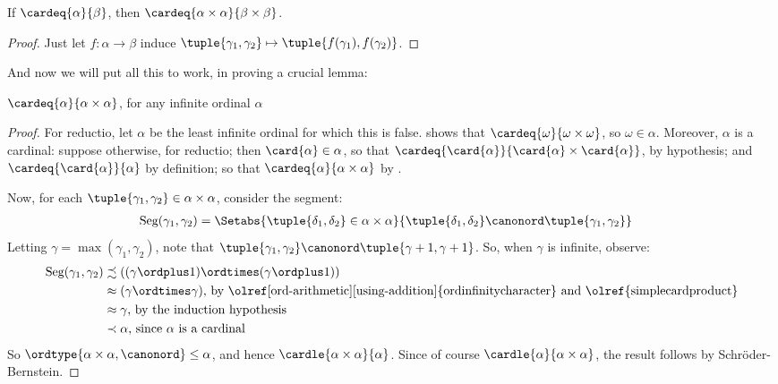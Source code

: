 \documentclass[../../../include/open-logic-section]{subfiles}
\begin{document}
\begin{prop}
If $\cardeq{\alpha}{\beta}$, then $\cardeq{\alpha \times \alpha}{\beta
\times \beta}$. 
\end{prop}

\begin{proof}
Just let $f \colon \alpha \to \beta$ induce $\tuple{\gamma_1,
\gamma_2} \mapsto \tuple{f(\gamma_1), f(\gamma_2)}$.
\end{proof}
\noindent
And now we will put all this to work, in proving a crucial lemma:
\begin{lem}
$\cardeq{\alpha}{\alpha \times \alpha}$, for any infinite ordinal
$\alpha$
\end{lem}

\begin{proof}
For reductio, let $\alpha$ be the least infinite ordinal for which
this is false.  shows
that $\cardeq{\omega}{\omega\times\omega}$, so $\omega \in \alpha$.
Moreover, $\alpha$ is a cardinal: suppose otherwise, for reductio;
then $\card{\alpha} \in \alpha$, so that
$\cardeq{\card{\alpha}}{\card{\alpha} \times \card{\alpha}}$, by
hypothesis; and $\cardeq{\card{\alpha}}{\alpha}$ by definition; so
that $\cardeq{\alpha}{\alpha\times\alpha}$ by
. 

Now, for each $\tuple{\gamma_1, \gamma_2} \in \alpha \times \alpha$,
consider the segment:
\begin{align*}
	\text{Seg}(\gamma_1, \gamma_2) &= \Setabs{\tuple{\delta_1, \delta_2} \in \alpha \times \alpha}{\tuple{\delta_1, \delta_2} \canonord \tuple{\gamma_1, \gamma_2}}
\end{align*}
Letting $\gamma = \max(\gamma_1, \gamma_2)$, note that $\tuple{\gamma_1, \gamma_2} \canonord \tuple{\gamma+1, \gamma + 1}$. So, when $\gamma$ is infinite, observe:
\begin{align*}
	\text{Seg}(\gamma_1, \gamma_2) & 
	\precsim ((\gamma \ordplus 1)\ordtimes (\gamma \ordplus 1))\\
	&\approx (\gamma \ordtimes \gamma)
	\text{, by \olref[ord-arithmetic][using-addition]{ordinfinitycharacter} and 
	\olref{simplecardproduct}}\\
	&\approx \gamma \text{, by the induction hypothesis}\\
	& \prec \alpha\text{, since $\alpha$ is a cardinal}
\end{align*}
So $\ordtype{\alpha\times \alpha, \canonord} \leq \alpha$, and hence
$\cardle{\alpha \times \alpha}{\alpha}$. Since of course
$\cardle{\alpha}{\alpha \times \alpha}$, the result follows by
Schr\"oder-Bernstein. 
\end{proof}
\end{document}
